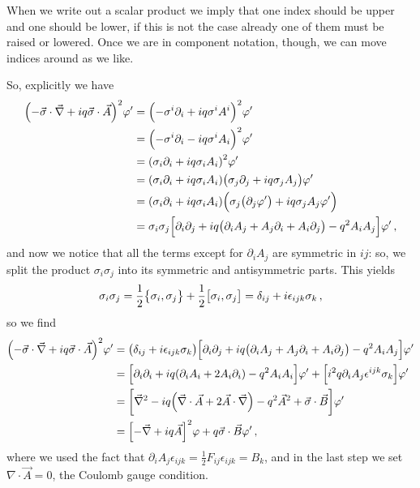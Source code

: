 \documentclass[main.tex]{subfiles}
\begin{document}
When we write out a scalar product we imply that one index should be upper and one should be lower, if this is not the case already one of them must be raised or lowered. Once we are in component notation, though, we can move indices around as we like.

So, explicitly we have 
%
\begin{align}
\qty(- \vec{\sigma} \cdot \vec{\nabla} + i q \vec{\sigma} \cdot \vec{A})^2 \varphi'
&= \qty(- \sigma^{i} \partial_{i} + i q \sigma^{i} A^{i})^2 \varphi'  \\
&= \qty(- \sigma^{i} \partial_{i} - i q \sigma^{i} A_{i})^2 \varphi'  \\
&= \qty( \sigma_{i} \partial_{i} + i q \sigma_{i} A_{i})^2 \varphi'  \\
&= \qty( \sigma_{i} \partial_{i} + i q \sigma_{i} A_{i})
\qty( \sigma_{j} \partial_{j} + i q \sigma_{j} A_{j}) \varphi '  \\
&= \qty( \sigma_{i} \partial_{i} + i q \sigma_{i} A_{i})
\qty(\sigma_{j} \qty(\partial_{j} \varphi ') + i q \sigma_{j} A_{j} \varphi ')  \\
&= \sigma_{i} \sigma_{j} \qty[\partial_{i} \partial_{j} + iq \qty(\partial_{i} A_{j} + A_{j} \partial_{i} + A_{i} \partial_{j} ) - q^2 A_{i} A_{j}] \varphi '
\,,
\end{align}
%
and now we notice that all the terms except for \(\partial_{i} A_{j}\) are symmetric in \(ij\): so, we split the product \(\sigma_{i} \sigma_{j}\) into its symmetric and antisymmetric parts. 
This yields 
%
\begin{align}
\sigma_{i} \sigma_{j} = \frac{1}{2} \qty{\sigma_{i}, \sigma_{j}} + \frac{1}{2} \qty[\sigma_{i}, \sigma_{j}] = \delta_{ij} + i \epsilon_{ijk} \sigma_{k}
\,,
\end{align}
%
so we find 
%
\begin{align}
\qty(- \vec{\sigma} \cdot \vec{\nabla} + i q \vec{\sigma} \cdot \vec{A})^2 \varphi'
&=
\qty(\delta_{ij} + i \epsilon_{ijk} \sigma_{k})
\qty[\partial_{i} \partial_{j} + iq \qty(\partial_{i} A_{j} + A_{j} \partial_{i} + A_{i} \partial_{j} ) - q^2 A_{i} A_{j}] \varphi '  \\
&= \qty[\partial_{i} \partial_{i} + i q \qty( \partial_{i} A_{i} + 2A_{i} \partial_{i}) - q^2 A_{i} A_{i}] \varphi '
+ \qty[i^2 q \partial_{i} A_{j} \epsilon^{ijk} \sigma_{k}] \varphi '  \\
&= \qty[\vec{\nabla}^2 - iq \qty(\vec{\nabla} \cdot \vec{A} + 2 \vec{A} \cdot \vec{\nabla}) - q^2 \vec{A}^2 
+ \vec{\sigma} \cdot \vec{B} ] \varphi'  \\
&= \qty[- \vec{\nabla} + iq \vec{A}]^2 \varphi + q\vec{\sigma} \cdot \vec{B} \varphi '
\,,
\end{align}
%
where we used the fact that \(\partial_{i} A_{j} \epsilon_{ijk} = \frac{1}{2} F_{ij} \epsilon_{ijk}  = B_{k}\), and in the last step we set \(\nabla \cdot \vec{A} = 0\), the Coulomb gauge condition.
\end{document}
